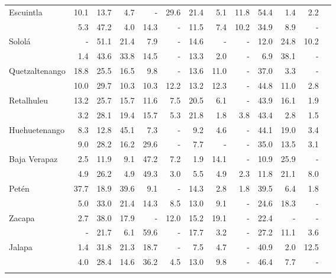 \begin{landscape}
\begin{center}
\begin{longtable}{lrrrrrrrrrrrr}
			\multicolumn{1}{l}{	Escuintla	}&	 10.1&13.7&4.7&-  &29.6&21.4&5.1&11.8&54.4&1.4&2.2\\ 
			\rowcolor{color1!5!white}\multicolumn{1}{l}{	Santa Rosa	}&	 5.3&47.2&4.0&14.3&-  &11.5&7.4&10.2&34.9&8.9&-  \\ 
			\multicolumn{1}{l}{	Sololá	}&	 -  &51.1&21.4&7.9&-  &14.6&-  &-  &12.0&24.8&10.2\\ 
			\rowcolor{color1!5!white}\multicolumn{1}{l}{	Totonicapán	}&	 1.4&43.6&33.8&14.5&-  &13.3&2.0&-  &6.9&38.1&-  \\ 
			\multicolumn{1}{l}{	Quetzaltenango	}&	 18.8&25.5&16.5&9.8&-  &13.6&11.0&-  &37.0&3.3&-  \\ 
			\rowcolor{color1!5!white}\multicolumn{1}{l}{	Suchitepéquez	}&	 10.0&29.7&10.3&10.3&12.2&13.2&12.3&-  &44.8&11.0&2.8\\ 
			\multicolumn{1}{l}{	Retalhuleu	}&	 13.2&25.7&15.7&11.6&7.5&20.5&6.1&-  &43.9&16.1&1.9\\ 
			\rowcolor{color1!5!white}\multicolumn{1}{l}{	San Marcos	}&	 3.2&28.1&19.4&15.7&5.3&21.8&1.8&3.8&43.4&2.8&1.5\\ 
			\multicolumn{1}{l}{	Huehuetenango	}&	 8.3&12.8&45.1&7.3&-  &9.2&4.6&-  &44.1&19.0&3.4\\ 
			\rowcolor{color1!5!white}\multicolumn{1}{l}{	Quiché	}&	 9.0&28.2&16.2&29.6&-  &7.7&-  &-  &35.0&13.5&3.1\\ 
			\multicolumn{1}{l}{	Baja Verapaz	}&	 2.5&11.9&9.1&47.2&7.2&1.9&14.1&-  &10.9&25.9&-  \\ 
			\rowcolor{color1!5!white}\multicolumn{1}{l}{	Alta Verapaz	}&	 4.9&26.2&4.9&49.3&3.0&5.5&4.9&2.3&11.8&21.1&8.0\\ 
			\multicolumn{1}{l}{	Petén	}&	 37.7&18.9&39.6&9.1&-  &14.3&2.8&1.8&39.5&6.4&1.8\\ 
			\rowcolor{color1!5!white}\multicolumn{1}{l}{	Izabal	}&	 5.0&33.0&21.4&14.3&8.5&13.0&9.1&-  &24.6&18.3&-  \\ 
			\multicolumn{1}{l}{	Zacapa	}&	 2.7&38.0&17.9&-  &12.0&15.2&19.1&-  &22.4&-  &-  \\ 
			\rowcolor{color1!5!white}\multicolumn{1}{l}{	Chiquimula	}&	 -  &21.7&6.1&59.6&-  &17.7&3.2&-  &27.2&11.1&3.6\\ 
			\multicolumn{1}{l}{	Jalapa	}&	 1.4&31.8&21.3&18.7&-  &7.5&4.7&-  &40.9&2.0&12.5\\ 
			\rowcolor{color1!5!white}\multicolumn{1}{l}{	Jutiapa	}&	 4.0&28.4&14.6&36.2&4.5&13.0&9.8&-  &46.4&7.7&-  \\ 
			\rowcolor{color1!40!white} \multicolumn{1}{l}{\Bold{	Categoría étnica	}}&		&		&		&		&		&		&		&		&		&		&		\\

\end{longtable}
\end{center}
\end{landscape}

